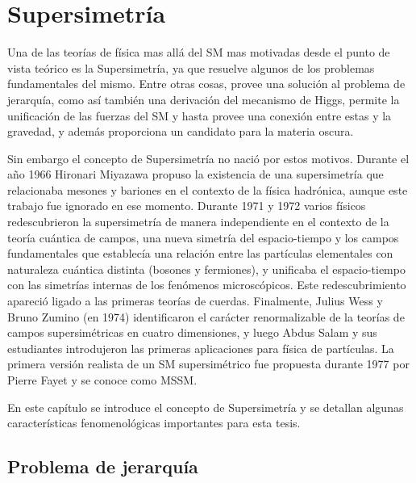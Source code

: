 \chapter{Supersimetría}

Una de las teorías de física mas allá del SM mas motivadas desde el punto de
vista teórico es la Supersimetría, ya que resuelve algunos de los problemas
fundamentales del mismo. Entre otras cosas, provee una solución al problema de
jerarquía, como así también una derivación del mecanismo de Higgs, permite la
unificación de las fuerzas del SM y hasta provee una conexión entre estas y la
gravedad, y además proporciona un candidato para la materia oscura.

Sin embargo el concepto de Supersimetría no nació por estos motivos. Durante el
a\~no 1966 Hironari Miyazawa propuso la existencia de una supersimetría que
relacionaba mesones y bariones en el contexto de la física hadrónica, aunque
este trabajo fue ignorado en ese momento.
Durante 1971 y 1972 varios físicos redescubrieron la supersimetría de manera
independiente en el contexto de la teoría cuántica de campos, una nueva simetría
del espacio-tiempo y los campos fundamentales que establecía una relación entre
las partículas elementales con naturaleza cuántica distinta (bosones y
fermiones), y unificaba el espacio-tiempo con las simetrías internas de los
fenómenos microscópicos. Este redescubrimiento apareció ligado a las primeras
teorías de cuerdas.
Finalmente, Julius Wess y Bruno Zumino (en 1974) identificaron el carácter
renormalizable de la teorías de campos supersimétricas en cuatro dimensiones, y
luego Abdus Salam y sus estudiantes introdujeron las primeras aplicaciones para
física de partículas. La primera versión realista de un SM supersimétrico fue
propuesta durante 1977 por Pierre Fayet y se conoce como MSSM.

En este capítulo se introduce el concepto de Supersimetría y se detallan algunas
características fenomenológicas importantes para esta tesis.


\section{Problema de jerarquía}

